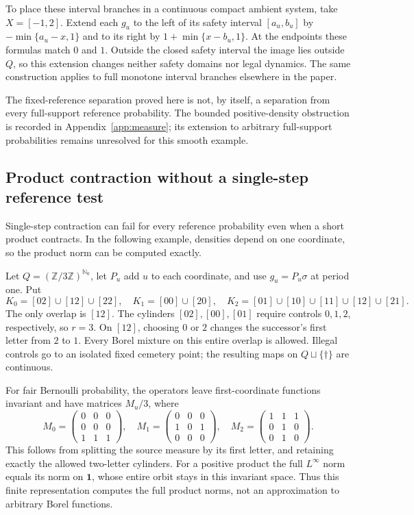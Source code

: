 \documentclass[11pt,reqno]{amsart}
\numberwithin{equation}{section}
\theoremstyle{definition}
\theoremstyle{definition}
\newcommand{\Nzero}{\mathbb N_0}
\newcommand{\one}{\mathbf 1}
\begin{document}
To place these interval branches in a continuous compact ambient
system, take $X=[-1,2]$. Extend each $g_u$ to the left of its
safety interval $[a_u,b_u]$ by $-\min\{a_u-x,1\}$ and to its
right by $1+\min\{x-b_u,1\}$. At the endpoints these formulas
match $0$ and $1$. Outside the closed safety interval the image
lies outside $Q$, so this extension changes neither safety domains
nor legal dynamics. The same construction applies to full monotone
interval branches elsewhere in the paper.

The fixed-reference separation proved here is not, by itself, a
separation from every full-support reference probability. The bounded
positive-density obstruction is recorded in
Appendix~\ref{app:measure}; its extension to arbitrary full-support
probabilities remains unresolved for this smooth example.

\subsection{Product contraction without a single-step reference test}
\label{subsec:product-example}
Single-step contraction can fail for every reference probability even
when a short product contracts. In the following example, densities
depend on one coordinate, so the product norm can be computed exactly.

Let $Q=(\mathbb Z/3\mathbb Z)^{\Nzero}$, let $P_u$ add $u$
to each coordinate, and use $g_u=P_u\sigma$ at period one. Put
\[
 K_0=[02]\cup[12]\cup[22],\quad K_1=[00]\cup[20],\quad
 K_2=[01]\cup[10]\cup[11]\cup[12]\cup[21].
\]
The only overlap is $[12]$. The cylinders $[02],[00],[01]$
require controls $0,1,2$, respectively, so $r=3$.
On $[12]$, choosing $0$ or $2$ changes the successor's first
letter from $2$ to $1$. Every Borel mixture on this entire overlap
is allowed. Illegal controls go to an isolated fixed cemetery point;
the resulting maps on $Q\sqcup\{\dagger\}$ are continuous.

For fair Bernoulli probability, the operators leave first-coordinate
functions invariant and have matrices $M_u/3$, where
\[
 M_0=\begin{pmatrix}0&0&0\\0&0&0\\1&1&1\end{pmatrix},\quad
 M_1=\begin{pmatrix}0&0&0\\1&0&1\\0&0&0\end{pmatrix},\quad
 M_2=\begin{pmatrix}1&1&1\\0&1&0\\0&1&0\end{pmatrix}.
\]
This follows from splitting the source measure by its first letter,
and retaining exactly the allowed two-letter cylinders. For a
positive product the full $L^\infty$ norm equals its norm on
$\one$, whose entire orbit stays in this invariant space. Thus this
finite representation computes the full product norms, not an
approximation to arbitrary Borel functions.
\end{document}
